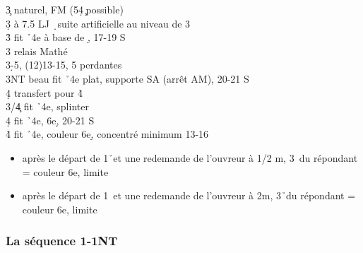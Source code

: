 \documentclass[a4paper]{article}
\begin{document}
\begin{bidtable}
3\c \> naturel, FM (5\d 4\c\ possible)\\
3\d {} à 7.5 LJ \d\ suite artificielle au niveau de 3\\
3\h \> fit \h\ 4e à base de \d , 17-19 S\+\\
3\s \> relais Mathé\-\\
3\s {}\d -5\s , (12)13-15, 5 perdantes\\
3NT \> beau fit \h\ 4e plat, supporte SA (arrêt AM), 20-21 S\+\\
4\d \> transfert pour 4\h \-\\
3\s/4\c \> fit \h\ 4e, splinter\\
4\d \> fit \h\ 4e, 6e\d , 20-21 S\\
4\h \> fit \h\ 4e, couleur 6e\d ,  concentré minimum 13-16
\end{bidtable}

\begin{itemize}
\item après le départ de 1\h\ et une redemande de l’ouvreur à 1\s /2 m, 3\s\ du répondant = couleur 6e, limite 

\item après le départ de 1\s\ et une redemande de l’ouvreur à 2m, 3\h\ du répondant = couleur 6e, limite

\end{itemize}

\subsubsection{La séquence 1\pdfs-1NT}
\end{document}
